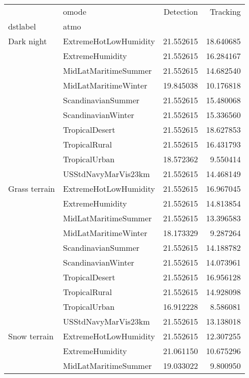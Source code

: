 \begin{tabular}{llrr}
\toprule
             & omode &  Detection &   Tracking \\
dstlabel & atmo &            &            \\
\midrule
Dark night & ExtremeHotLowHumidity &  21.552615 &  18.640685 \\
             & ExtremeHumidity &  21.552615 &  16.284167 \\
             & MidLatMaritimeSummer &  21.552615 &  14.682540 \\
             & MidLatMaritimeWinter &  19.845038 &  10.176818 \\
             & ScandinavianSummer &  21.552615 &  15.480068 \\
             & ScandinavianWinter &  21.552615 &  15.336560 \\
             & TropicalDesert &  21.552615 &  18.627853 \\
             & TropicalRural &  21.552615 &  16.431793 \\
             & TropicalUrban &  18.572362 &   9.550414 \\
             & USStdNavyMarVis23km &  21.552615 &  14.468149 \\
Grass terrain & ExtremeHotLowHumidity &  21.552615 &  16.967045 \\
             & ExtremeHumidity &  21.552615 &  14.813854 \\
             & MidLatMaritimeSummer &  21.552615 &  13.396583 \\
             & MidLatMaritimeWinter &  18.173329 &   9.287264 \\
             & ScandinavianSummer &  21.552615 &  14.188782 \\
             & ScandinavianWinter &  21.552615 &  14.073961 \\
             & TropicalDesert &  21.552615 &  16.956128 \\
             & TropicalRural &  21.552615 &  14.928098 \\
             & TropicalUrban &  16.912228 &   8.586081 \\
             & USStdNavyMarVis23km &  21.552615 &  13.138018 \\
Snow terrain & ExtremeHotLowHumidity &  21.552615 &  12.307255 \\
             & ExtremeHumidity &  21.061150 &  10.675296 \\
             & MidLatMaritimeSummer &  19.033022 &   9.800950 \\

\end{tabular}
